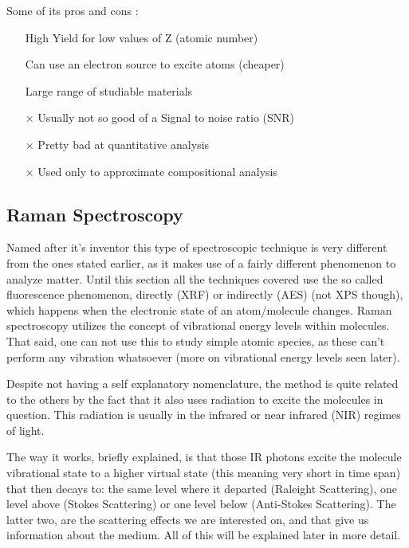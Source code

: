 \documentclass[]{report}
\begin{document}
\newpage

Some of its pros and cons \cite{TH_Many}:
\begin{itemize}
\item[\checkmark] High Yield for low values of Z (atomic number)
\item[\checkmark] Can use an electron source to excite atoms (cheaper)
\item[\checkmark] Large range of studiable materials
\item[$\times$] Usually not so good of a Signal to noise ratio (SNR)
\item[$\times$] Pretty bad at quantitative analysis
\item[$\times$] Used only to approximate compositional analysis
\end{itemize}

\subsection{Raman Spectroscopy} \label{RMS}
Named after it's inventor this type of spectroscopic technique is very different from the ones stated earlier, as it makes use of a fairly different phenomenon to analyze matter. Until this section all the techniques covered use the so called fluorescence phenomenon, directly (XRF) or indirectly (AES) (not XPS though), which happens when the electronic state of an atom/molecule changes. Raman spectroscopy utilizes the concept of vibrational energy levels within molecules. That said, one can not use this to study simple atomic species, as these can't perform any vibration whatsoever (more on vibrational energy levels seen later).
\par Despite not having a self explanatory nomenclature, the method is quite related to the others by the fact that it also uses radiation to excite the molecules in question. This radiation is usually in the infrared or near infrared (NIR) regimes of light.
\par The way it works, briefly explained, is that those IR photons excite the molecule vibrational state to a higher virtual state (this meaning very short in time span) that then decays to: the same level where it departed (Raleight Scattering), one level above (Stokes Scattering) or one level below (Anti-Stokes Scattering). The latter two, are the scattering effects we are interested on, and that give us information about the medium. All of this will be explained later in more detail.\\
\end{document}
